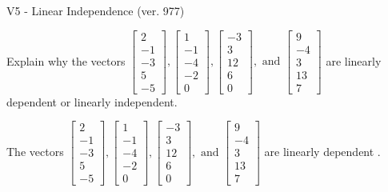 \begin{exercise}
  \begin{exerciseTitle}V5 - Linear Independence (ver. 977)\end{exerciseTitle}
  \begin{exerciseStatement}
    Explain why the vectors \(\left[\begin{array}{r}
2 \\
-1 \\
-3 \\
5 \\
-5
\end{array}\right] , \left[\begin{array}{r}
1 \\
-1 \\
-4 \\
-2 \\
0
\end{array}\right] , \left[\begin{array}{r}
-3 \\
3 \\
12 \\
6 \\
0
\end{array}\right] , \text{ and } \left[\begin{array}{r}
9 \\
-4 \\
3 \\
13 \\
7
\end{array}\right]\) are linearly dependent or linearly independent.	


  \end{exerciseStatement}
  \begin{exerciseAnswer}
   The vectors \(\left[\begin{array}{r}
2 \\
-1 \\
-3 \\
5 \\
-5
\end{array}\right] , \left[\begin{array}{r}
1 \\
-1 \\
-4 \\
-2 \\
0
\end{array}\right] , \left[\begin{array}{r}
-3 \\
3 \\
12 \\
6 \\
0
\end{array}\right] , \text{ and } \left[\begin{array}{r}
9 \\
-4 \\
3 \\
13 \\
7
\end{array}\right]\) are 
  	 linearly dependent  .
  


  \end{exerciseAnswer}
\end{exercise}